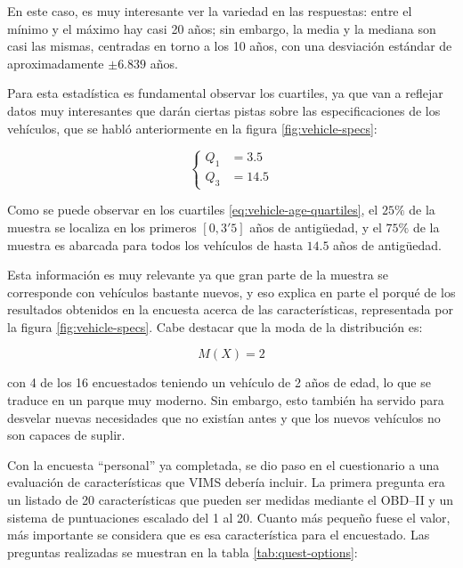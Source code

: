 En este caso, es muy interesante ver la variedad en las respuestas: entre el mínimo
y el máximo hay casi 20 años; sin embargo, la media y la mediana son casi las mismas,
centradas en torno a los 10 años, con una desviación estándar de aproximadamente
$\pm 6.839$ años.

Para esta estadística es fundamental observar los cuartiles, ya que van a reflejar
datos muy interesantes que darán ciertas pistas sobre las especificaciones de los
vehículos, que se habló anteriormente en la figura \ref{fig:vehicle-specs}:

\begin{equation}\label{eq:vehicle-age-quartiles}
  \left\{
  \begin{aligned}
    Q_1 & = 3.5  \\
    Q_3 & = 14.5
  \end{aligned}
  \right.
\end{equation}

Como se puede observar en los cuartiles \ref{eq:vehicle-age-quartiles}, el $25\%$ de
la muestra se localiza en los primeros $\left[0, 3'5\right]$ años de antigüedad, y el
$75\%$ de la muestra es abarcada para todos los vehículos de hasta $14.5$ años de
antigüedad.

Esta información es muy relevante ya que gran parte de la muestra se corresponde con
vehículos bastante nuevos, y eso explica en parte el porqué de los resultados obtenidos
en la encuesta acerca de las características, representada por la figura \ref{fig:vehicle-specs}.
Cabe destacar que la moda de la distribución es:

\begin{equation}\label{eq:vehicle-age-mode}
  M\left(X\right) = 2
\end{equation}

con 4 de los 16 encuestados teniendo un vehículo de 2 años de edad, lo que se traduce
en un parque muy moderno. Sin embargo, esto también ha servido para desvelar nuevas
necesidades que no existían antes y que los nuevos vehículos no son capaces de
suplir.

Con la encuesta ``personal'' ya completada, se dio paso en el cuestionario a una
evaluación de características que \ac{VIMS} debería incluir. La primera pregunta era
un listado de 20 características que pueden ser medidas mediante el \ac{OBD}--II
y un sistema de puntuaciones escalado del 1 al 20. Cuanto más pequeño fuese el valor,
más importante se considera que es esa característica para el encuestado. Las preguntas
realizadas se muestran en la tabla \ref{tab:quest-options}:

